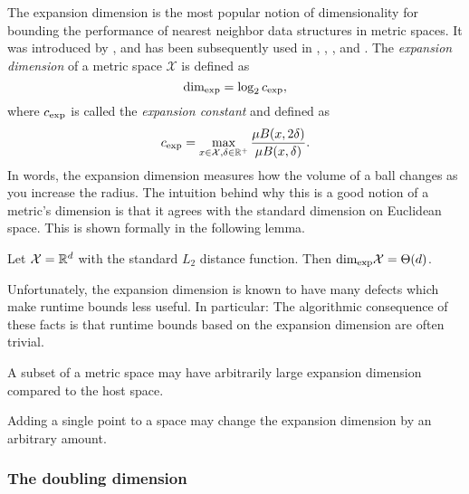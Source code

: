 \documentclass[../main.tex]{subfiles}
\newcommand{\set}[1]{\mathcal {#1}}
\newcommand{\krdim}{\text{dim}_\textnormal{exp}}
\newcommand{\krnum}{c_\textnormal{exp}}
\begin{document}
The expansion dimension is the most popular notion of dimensionality for bounding the performance of nearest neighbor data structures in metric spaces.
It was introduced by
\citet{karger2002finding},
and has been subsequently used in
\citet{krauthgamer2004navigating},
\citet{beygelzimer2006cover},
\citet{ram2009linear},
and \citet{curtin2015plug}.
The \emph{expansion dimension} of a metric space $\set X$ is defined as
\begin{equation}
    \krdim = \log_2 \krnum
    ,
\end{equation}
where $\krnum$ is called the \emph{expansion constant} and defined as
\begin{equation}
    \krnum = \max_{x\in\set X, \delta\in\R^+} \frac{\mu B(x,2\delta)}{\mu B(x,\delta)}
    .
\end{equation}
In words, the expansion dimension measures how the volume of a ball changes as you increase the radius.
The intuition behind why this is a good notion of a metric's dimension is that it agrees with the standard dimension on Euclidean space.
This is shown formally in the following lemma.
\begin{lemma}
    Let $\set X=\R^d$ with the standard $L_2$ distance function.
    Then $\krdim\set X=\Theta(d)$.
\end{lemma}
Unfortunately, the expansion dimension is known to have many defects which make runtime bounds less useful.
In particular:
The algorithmic consequence of these facts is that runtime bounds based on the expansion dimension are often trivial.

\begin{example}
    A subset of a metric space may have arbitrarily large expansion dimension compared to the host space.
\end{example}

\begin{example}
    Adding a single point to a space may change the expansion dimension by an arbitrary amount.
\end{example}


\subsubsection{The doubling dimension}
\end{document}
